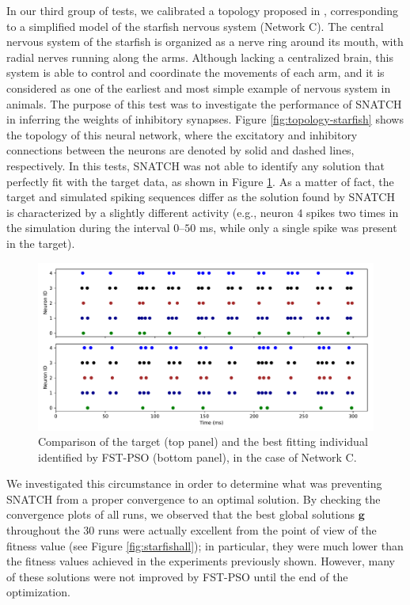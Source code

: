 \documentclass[utf8]{frontiersFPHY} %
\newcommand {\name}{SNATCH}
\begin{document}
In our third group of tests, we calibrated a topology proposed in \cite{suzuki1971dynamics}, corresponding to a simplified model of the starfish nervous system (Network C).
The central nervous system of the starfish is organized as a nerve ring around its mouth, with radial nerves running along the arms.
Although lacking a centralized brain, this system is able to control and coordinate the movements of each arm, and it is considered as one of the earliest and most simple example of nervous system in animals.
The purpose of this test was to investigate the performance of \name{} in  inferring the weights of inhibitory synapses. 
Figure \ref{fig:topology-starfish} shows the topology of this neural network, where the excitatory and inhibitory connections between the neurons are denoted by solid and dashed lines, respectively.
In this tests, \name{} was not able to identify any solution that perfectly fit with the target data, as shown in Figure \ref{fig:target-stellona}. 
As a matter of fact, the target and simulated spiking sequences differ as the solution found by \name{} is characterized by a slightly different activity (e.g., neuron $4$ spikes two times in the simulation during the interval $0$--$50$ ms, while only a single spike was present in the target).

\begin{figure}[!ht]
	\centering
	\includegraphics[width=\textwidth]{images/failed-starfish/target_sim.pdf}
	\caption{Comparison of the target (top panel) and the best fitting individual identified by FST-PSO (bottom panel), in the case of Network C. }
	\label{fig:target-stellona}
\end{figure}

We investigated this circumstance in order to determine what was preventing \name{} from a proper convergence to an optimal solution. 
By checking the convergence plots of all runs, we observed that the best global solutions $\textbf{g}$ throughout the 30 runs were actually excellent from the point of view of the fitness value (see Figure \ref{fig:starfishall}); in particular, they were much lower than the fitness values achieved in the experiments previously shown. 
However, many of these solutions were not improved by FST-PSO until the end of the optimization.
\end{document}
